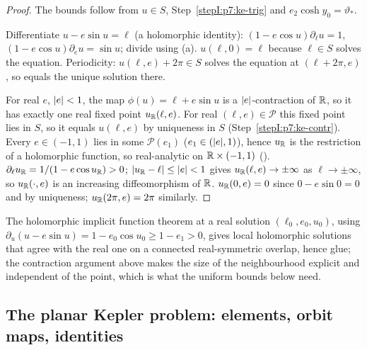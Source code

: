 \begin{proof}
\label{stepI:p7:ke-a} The bounds follow from $u\in S$, Step~\ref{stepI:p7:ke-trig} and $e_2\cosh y_0=\vartheta_*$.

\label{stepI:p7:ke-b} Differentiate $u-e\sin u=\ell$ (a holomorphic identity): $(1-e\cos u)\partial_\ell u=1$, $(1-e\cos u)\partial_eu=\sin u$; divide using (a). $u(\ell,0)=\ell$ because $\ell\in S$ solves the equation. Periodicity: $u(\ell,e)+2\pi\in S$ solves the equation at $(\ell+2\pi,e)$, so equals the unique solution there.

\label{stepI:p7:ke-c} For real $e$, $\lvert e\rvert<1$, the map $\phi(u)=\ell+e\sin u$ is a $\lvert e\rvert$-contraction of $\mathbb{R}$, so it has exactly one real fixed point $u_{\mathbb{R}}(\ell,e)$. For real $(\ell,e)\in\mathcal P$ this fixed point lies in $S$, so it equals $u(\ell,e)$ by uniqueness in $S$ (Step~\ref{stepI:p7:ke-contr}).
Every $e\in(-1,1)$ lies in some $\mathcal P(e_1)$ ($e_1\in(\lvert e\rvert,1)$), hence $u_{\mathbb{R}}$ is the restriction of a holomorphic function, so real-analytic on $\mathbb{R}\times(-1,1)$ (). $\partial_\ell u_{\mathbb{R}}=1/(1-e\cos u_{\mathbb{R}})>0$; $\lvert u_{\mathbb{R}}-\ell\rvert\le\lvert e\rvert<1$ gives $u_{\mathbb{R}}(\ell,e)\to\pm\infty$ as $\ell\to\pm\infty$, so $u_{\mathbb{R}}(\cdot,e)$ is an increasing diffeomorphism of $\mathbb{R}$. $u_{\mathbb{R}}(0,e)=0$ since $0-e\sin0=0$ and by uniqueness; $u_{\mathbb{R}}(2\pi,e)=2\pi$ similarly.
\end{proof}

\begin{remark}\label{bpI:p7:ke-ift}
The holomorphic implicit function theorem at a real solution $(\ell_0,e_0,u_0)$, using $\partial_u(u-e\sin u)=1-e_0\cos u_0\ge1-e_1>0$, gives local holomorphic solutions that agree with the real one on a connected real-symmetric overlap, hence glue; the contraction argument above makes the size of the neighbourhood explicit and independent of the point, which is what the uniform bounds below need.
\end{remark}

\subsection{The planar Kepler problem: elements, orbit maps, identities}\label{bpI:p7:sec-orbits}

